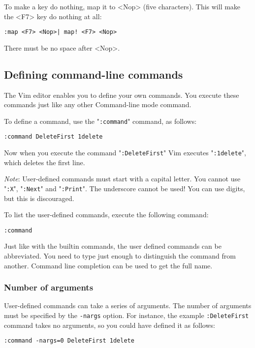 To make a key do nothing, map it to <Nop> (five characters).
This will make the <F7> key do nothing at all:

\begin{Verbatim}[samepage=true]
 :map <F7> <Nop>| map! <F7> <Nop>
\end{Verbatim}

There must be no space after <Nop>.
\subsection{Defining command-line commands}
The Vim editor enables you to define your own commands.
You execute these commands just like any other Command-line mode command.

To define a command, use the "\texttt{:command}" command, as follows:

\begin{Verbatim}[samepage=true]
 :command DeleteFirst 1delete
\end{Verbatim}

Now when you execute the command "\texttt{:DeleteFirst}" Vim executes "\texttt{:1delete}", which deletes the first line.

\emph{Note}: User-defined commands must start with a capital letter.
You cannot use "\texttt{:X}", "\texttt{:Next}" and "\texttt{:Print}".
The underscore cannot be used!  You can use digits, but this is discouraged.

To list the user-defined commands, execute the following command:

\begin{Verbatim}[samepage=true]
 :command
\end{Verbatim}

Just like with the builtin commands, the user defined commands can be abbreviated.
You need to type just enough to distinguish the command from another.
Command line completion can be used to get the full name.

\subsubsection{Number of arguments}
User-defined commands can take a series of arguments.
The number of arguments must be specified by the \texttt{-nargs} option.
For instance, the example \texttt{:DeleteFirst} command takes no arguments, so you could have defined it as follows:

\begin{Verbatim}[samepage=true]
 :command -nargs=0 DeleteFirst 1delete
\end{Verbatim}

